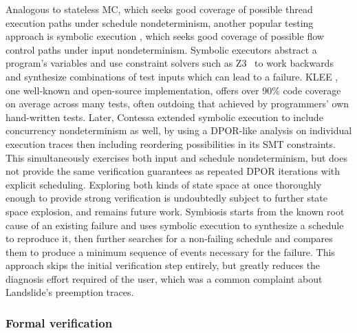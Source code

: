 Analogous to stateless MC,
which seeks good coverage of possible thread execution paths under schedule nondeterminism,
another popular testing approach is symbolic execution \cite{symbolic-execution},
which seeks good coverage of possible flow control paths under input nondeterminism.
Symbolic executors
abstract a program's variables and use constraint solvers such as Z3~\cite{z3}
to work backwards and synthesize combinations of test inputs which can lead to a failure.
%
KLEE \cite{klee}, one well-known and open-source implementation,
offers over 90\% code coverage on average across many tests,
often outdoing that achieved by programmers' own hand-written tests.
%
Later, Contessa \cite{contessa} extended symbolic execution to include concurrency nondeterminism as well,
by using a DPOR-like analysis on individual execution traces
then including reordering possibilities in its SMT constraints.
This simultaneously exercises both input and schedule nondeterminism,
but does not provide the same verification guarantees as repeated DPOR iterations with explicit scheduling.
Exploring both kinds of state space at once thoroughly enough to provide strong verification
is undoubtedly subject to further state space explosion,
and remains future work.
%
Symbiosis \cite{symbiosis} starts from the known root cause of an existing failure
and uses symbolic execution to synthesize a schedule to reproduce it,
then further searches for a non-failing schedule and compares them to produce
a minimum sequence of events necessary for the failure.
This approach skips the initial verification step entirely,
but greatly reduces the diagnosis effort required of the user,
which was a common complaint about Landslide's preemption traces.

\subsubsection{Formal verification}

